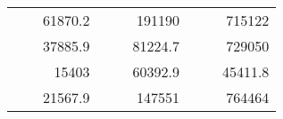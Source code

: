 \begin{table}[H]
\begin{tabular}{|ccrccrccc}
\rowcolor[HTML]{DDFDFF} 
\multicolumn{1}{|c|}{\cellcolor[HTML]{FFFFC7}}                                & \multicolumn{1}{c|}{\cellcolor[HTML]{DDFDFF}}                      & \multicolumn{1}{r|}{\cellcolor[HTML]{DAE8FC}61870.2}   & \multicolumn{1}{c|}{\cellcolor[HTML]{FFFFC7}}                                & \multicolumn{1}{c|}{\cellcolor[HTML]{DDFDFF}}                       & \multicolumn{1}{r|}{\cellcolor[HTML]{DDFDFF}191190}    & \multicolumn{1}{c|}{\cellcolor[HTML]{FFFFC7}}                                & \multicolumn{1}{c|}{\cellcolor[HTML]{DDFDFF}}                      & \multicolumn{1}{r|}{\cellcolor[HTML]{DDFDFF}715122}    \\ \cline{3-3} \cline{6-6} \cline{9-9} 
\multicolumn{1}{|c|}{\cellcolor[HTML]{FFFFC7}}                                & \multicolumn{1}{c|}{\cellcolor[HTML]{DDFDFF}}                      & \multicolumn{1}{r|}{\cellcolor[HTML]{DDFDFF}37885.9}   & \multicolumn{1}{c|}{\cellcolor[HTML]{FFFFC7}}                                & \multicolumn{1}{c|}{\cellcolor[HTML]{DDFDFF}}                       & \multicolumn{1}{r|}{\cellcolor[HTML]{DAE8FC}81224.7}   & \multicolumn{1}{c|}{\cellcolor[HTML]{FFFFC7}}                                & \multicolumn{1}{c|}{\cellcolor[HTML]{DDFDFF}}                      & \multicolumn{1}{r|}{\cellcolor[HTML]{DAE8FC}729050}    \\ \cline{3-3} \cline{6-6} \cline{9-9} 
\rowcolor[HTML]{DDFDFF} 
\multicolumn{1}{|c|}{\cellcolor[HTML]{FFFFC7}}                                & \multicolumn{1}{c|}{\cellcolor[HTML]{DDFDFF}}                      & \multicolumn{1}{r|}{\cellcolor[HTML]{DAE8FC}15403}     & \multicolumn{1}{c|}{\cellcolor[HTML]{FFFFC7}}                                & \multicolumn{1}{c|}{\cellcolor[HTML]{DDFDFF}}                       & \multicolumn{1}{r|}{\cellcolor[HTML]{DDFDFF}60392.9}   & \multicolumn{1}{c|}{\cellcolor[HTML]{FFFFC7}}                                & \multicolumn{1}{c|}{\cellcolor[HTML]{DDFDFF}}                      & \multicolumn{1}{r|}{\cellcolor[HTML]{DDFDFF}45411.8}   \\ \cline{3-3} \cline{6-6} \cline{9-9} 
\multicolumn{1}{|c|}{\cellcolor[HTML]{FFFFC7}}                                & \multicolumn{1}{c|}{\cellcolor[HTML]{DDFDFF}}                      & \multicolumn{1}{r|}{\cellcolor[HTML]{DDFDFF}21567.9}   & \multicolumn{1}{c|}{\cellcolor[HTML]{FFFFC7}}                                & \multicolumn{1}{c|}{\cellcolor[HTML]{DDFDFF}}                       & \multicolumn{1}{r|}{\cellcolor[HTML]{DAE8FC}147551}    & \multicolumn{1}{c|}{\cellcolor[HTML]{FFFFC7}}                                & \multicolumn{1}{c|}{\cellcolor[HTML]{DDFDFF}}                      & \multicolumn{1}{r|}{\cellcolor[HTML]{DAE8FC}764464}    \\ \cline{3-3} \cline{6-6} \cline{9-9} 

\end{tabular}
\end{table}
